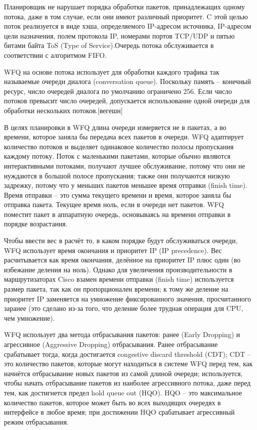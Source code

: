     Планировщик не нарушает порядка обработки пакетов,
    принадлежащих одному потока, даже в том случае, если они имеют различный приоритет.
    C этой целью поток реализуется в виде хэша, определяемого IP-адресом источника,
    IP-адресом цели назначения, полем протокола IP, номерами портов TCP/UDP и пятью
    битами байта ToS (Type of Service).Очередь потока обслуживается в соответствии с алгоритмом FIFO.


    WFQ на основе потока использует для обработки каждого трафика так называемые
    очереди диалога (conversation queue).
    Поскольку память -- конечный ресурс, число очередей диалога по умолчанию
    ограничено 256. Если число потоков превысит число очередей, допускается
    использование одной очереди для обработки нескольких потоков.[вегешн]

    В целях планировки в WFQ длина очереди измеряется не в пакетах, а во времени,
    которое заняла бы передача всех пакетов в очереди. WFQ адаптирует количество
    потоков и выделяет одинаковое количество полосы пропускания каждому потоку.
    Поток с маленькими пакетами, которые обычно являются интерактивными потоками,
    получают лучшее обслуживание, потому что они не нуждаются в большой полосе пропускания;
    также они получаются низкую задрежку, потому что у меньших пакетов меньшее
    время отправки (finish time). Время отправки -- это сумма текущего времени и
    время, которое заняла бы отправка пакета. Текущее время ноль, если в очереди
    нет пакетов. WFQ поместит пакет в аппаратную очередь, основываясь на времени отправки в
    порядке возрастания.

    Чтобы ввести вес в расчёт то, в каком порядке будут обслуживаться очереди,
    WFQ использует время окончания и приоритет IP (IP precedence). Вес расчитывается
    как время окончания, делённое на приоритет IP плюс один (во избежание деления
    на ноль). Однако для увеличения производительности в маршрутизаторах Cisco
    взамен времени отправки (finish time) используется размер пакета, так как он
    пропорционален времени; к тому же деление на приоритет IP заменяется на умножение
    фиксированного значения, просчитанного заранее (это сделано из-за того,
    что деление более трудная операция для CPU, чем умножение).

    WFQ использует два метода отбрасывания пакетов: ранее (Early Dropping) и агрессивное
    (Aggressive Dropping) отбрасывания. Ранее отбрасывание срабатывает тогда, когда
    достигается congestive discard threshold (CDT); CDT -- это количество пакетов, которые могут
    находиться в системе WFQ перед тем, как начнётся отбрасывание новых пакетов
    из самой длиной очереди; используется, чтобы начать отбрасывание пакетов
    из наиболее агрессивного потока, даже перед тем, как достигнется предел
    hold queue out (HQO). HQO -- это максимальное количество пакетов, которое может быть
    во всех выходящих очередях в интерфейсе в любое время; при достижении HQO
    срабатывает агрессивный режим отбрасывания.

